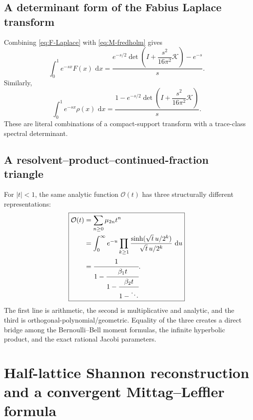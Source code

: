 \documentclass[11pt]{article}
\theoremstyle{definition}
\theoremstyle{remark}
\newcommand{\dd}{\,\mathrm d}
\newcommand{\cO}{\mathcal O}
\newcommand{\cK}{\mathcal K}
\begin{document}
\subsection{A determinant form of the Fabius Laplace transform}

Combining \eqref{eq:F-Laplace} with \eqref{eq:M-fredholm} gives
\begin{equation}
 \int_0^1e^{-sx}F(x)\,\dd x
 =\frac{e^{-s/2}
 \det\!\left(I+\dfrac{s^2}{16\pi^2}\cK\right)-e^{-s}}{s}.  \label{eq:F-Laplace-determinant}
\end{equation}
Similarly,
\begin{equation}
 \int_0^1e^{-sx}\rho(x)\,\dd x
 =\frac{1-e^{-s/2}
 \det\!\left(I+\dfrac{s^2}{16\pi^2}\cK\right)}{s}.         \label{eq:rho-half-determinant}
\end{equation}
These are literal combinations of a compact-support transform with a trace-class spectral
determinant.

\subsection{A resolvent--product--continued-fraction triangle}

For \(|t|<1\), the same analytic function \(\cO(t)\) has three structurally different
representations:
\begin{equation}
 \boxed{
 \begin{aligned}
 \cO(t)
 &=\sum_{n\ge0}\mu_{2n}t^n\\
 &=\int_0^{\infty}e^{-u}
   \prod_{k\ge1}\frac{\sinh(\sqrt t\,u/2^k)}{\sqrt t\,u/2^k}\,\dd u\\
 &=\cfrac{1}{1-\cfrac{\beta_1t}{1-\cfrac{\beta_2t}{1-\ddots}}}.
 \end{aligned}
 }                                                           \label{eq:triangle}
\end{equation}
The first line is arithmetic, the second is multiplicative and analytic, and the third is
orthogonal-polynomial/geometric.  Equality of the three creates a direct bridge among the
Bernoulli--Bell moment formulas, the infinite hyperbolic product, and the exact rational
Jacobi parameters.


\section{Half-lattice Shannon reconstruction and a convergent Mittag--Leffler formula}
\label{sec:half-lattice-sampling}
\end{document}
